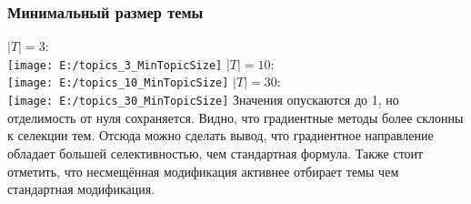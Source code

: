 \documentclass[12pt]{article}
\begin{document}
\subsubsection{Минимальный размер темы}
$|T| = 3$:\\
\texttt{[image: E:/topics\_3\_MinTopicSize]}
$|T| = 10$:\\
\texttt{[image: E:/topics\_10\_MinTopicSize]}
$|T| = 30$:\\
\texttt{[image: E:/topics\_30\_MinTopicSize]}
Значения опускаются до 1, но отделимость от нуля сохраняется.  Видно, что градиентные методы более склонны к селекции тем. Отсюда можно сделать вывод, что градиентное направление обладает большей селективностью, чем стандартная формула. Также стоит отметить, что несмещённая модификация активнее отбирает темы чем стандартная модификация.
\end{document}

